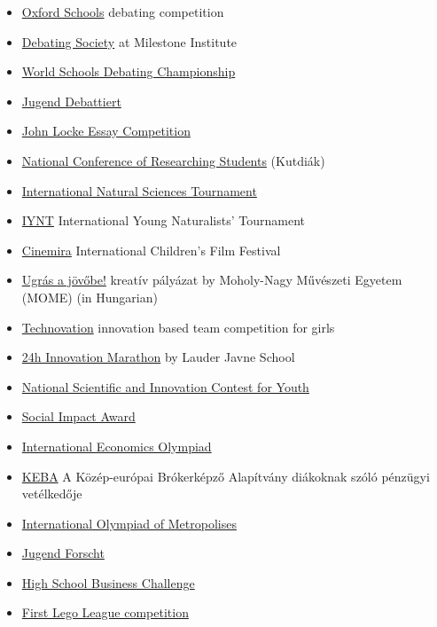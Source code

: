 \documentclass{article}
\begin{document}
\begin{itemize}
    \item \href{https://www.oxfordschools.net/}{Oxford Schools} debating competition
    \item \href{https://archive.milestone-institute.org/society/debating-society/}{Debating Society} at Milestone Institute
    \item \href{https://www.wsdcdebating.org/}{World Schools Debating Championship}
    \item \href{https://www.jugend-debattiert.eu/}{Jugend Debattiert}
    \item \href{https://www.johnlockeinstitute.com/essay-competition}{John Locke Essay Competition}
    \item \href{https://www.kutdiak.hu/en/events/}{National Conference of Researching Students} (Kutdiák)
    \item \href{https://scitourn.com/}{International Natural Sciences Tournament}
    \item \href{http://iynt.org/}{IYNT} International Young Naturalists' Tournament
    \item \href{https://www.cinemira.hu/en/}{Cinemira} International Children's Film Festival
    \item \href{https://ugrasajovobe.mome.hu/}{Ugrás a jövőbe!} kreatív pályázat by Moholy-Nagy Művészeti Egyetem (MOME) (in Hungarian)
    \item \href{https://technovationchallenge.org/}{Technovation} innovation based team competition for girls
    \item \href{https://lim.lauder.hu/}{24h Innovation Marathon} by Lauder Javne School
    \item \href{https://www.innovacio.hu/en_3a.htm}{National Scientific and Innovation Contest for Youth}
    \item \href{https://hungary.socialimpactaward.net/en/}{Social Impact Award}
    \item \href{https://ecolymp.org/}{International Economics Olympiad}
    \item \href{https://kebaverseny.hu/}{KEBA} A Közép-európai Brókerképző Alapítvány diákoknak szóló pénzügyi vetélkedője
    \item \href{http://megapolis.educom.ru/en}{International Olympiad of Metropolises}
    \item \href{https://www.jugend-forscht.de/}{Jugend Forscht}
    \item \href{https://businessismore.eu/}{High School Business Challenge}
    \item \href{https://www.firstlegoleague.org/}{First Lego League competition}

\end{itemize}
\end{document}
